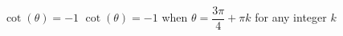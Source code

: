 {$\cot(\theta) = -1$}
{$\cot(\theta) = -1$ when $\theta = \dfrac{3\pi}{4} + \pi k$ for any integer $k$}
